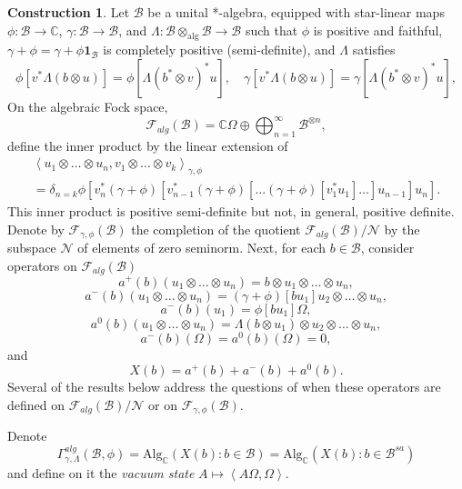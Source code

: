 \documentclass[12pt]{amsart}
\theoremstyle{definition}
\newtheorem{Construction}[Thm]{Construction}
\newcommand{\mf}[1]{\mathbb{#1}}
\newcommand{\mc}[1]{\mathcal{#1}}
\newcommand{\mb}[1]{\mathbf{#1}}
\newcommand{\ip}[2]{\left \langle{#1},{#2} \right \rangle}
\begin{document}
\begin{Construction}
\label{Construction:gamma}
Let $\mc{B}$ be a unital *-algebra, equipped with star-linear maps $\phi : \mc{B} \rightarrow \mf{C}$, $\gamma : \mc{B} \rightarrow \mc{B}$, and $\Lambda: \mc{B} \otimes_{\text{alg}} \mc{B} \rightarrow \mc{B}$ such that $\phi$ is positive and faithful, $\gamma + \phi = \gamma + \phi \mb{1}_{\mc{B}}$ is completely positive (semi-definite), and $\Lambda$ satisfies
\begin{equation}
\label{Eq:a0-symmetric}
\phi[v^\ast \Lambda(b \otimes u)] = \phi[\Lambda(b^\ast \otimes v)^\ast u], \quad \gamma[v^\ast \Lambda(b \otimes u)] = \gamma[\Lambda(b^\ast \otimes v)^\ast u],
\end{equation}
On the algebraic Fock space,
\[
\mc{F}_{alg}(\mc{B}) = \mf{C} \Omega \oplus \bigoplus_{n=1}^\infty \mc{B}^{\otimes n},
\]
define the inner product by the linear extension of
\begin{multline}
\label{Eq:Inner-product}
\ip{u_1 \otimes \ldots \otimes u_n}{v_1 \otimes \ldots \otimes v_k}_{\gamma,\phi} \\
= \delta_{n=k} \phi \left[ v_n^\ast (\gamma + \phi)[v_{n-1}^\ast (\gamma + \phi)[ \ldots (\gamma + \phi)[ v_1^\ast u_1] \ldots ] u_{n-1}] u_n \right].
\end{multline}
This inner product is positive semi-definite but not, in general, positive definite. Denote by $\mc{F}_{\gamma, \phi}(\mc{B})$ the completion of the quotient  $\mc{F}_{alg}(\mc{B}) / \mc{N}$ by the subspace $\mc{N}$ of elements of zero seminorm. Next, for each $b \in \mc{B}$, consider operators on $\mc{F}_{alg}(\mc{B})$
\[
a^+(b) (u_1 \otimes \ldots \otimes u_n) = b \otimes u_1 \otimes \ldots \otimes u_n,
\]
\[
a^-(b) (u_1 \otimes \ldots \otimes u_n) = (\gamma + \phi)[b u_1] u_2 \otimes \ldots \otimes u_n,
\]
\[
a^-(b) (u_1) = \phi[b u_1] \Omega,
\]
\[
a^0(b) (u_1 \otimes \ldots \otimes u_n) = \Lambda(b \otimes u_1) \otimes  u_2 \otimes \ldots \otimes u_n,
\]
\[
a^-(b) (\Omega) = a^0(b)(\Omega) = 0,
\]
and
\[
X(b) = a^+(b) + a^-(b) + a^0(b).
\]
Several of the results below address the questions of when these operators are defined on $\mc{F}_{alg}(\mc{B}) / \mc{N}$ or on $\mc{F}_{\gamma, \phi}(\mc{B})$.

Denote
\[
\Gamma^{alg}_{\gamma, \Lambda}(\mc{B}, \phi) = \mathrm{Alg}_{\mf{C}}(X(b) : b \in \mc{B}) = \mathrm{Alg}_{\mf{C}}(X(b) : b \in \mc{B}^{sa})
\]
and define on it the \emph{vacuum state} $A \mapsto \ip{A \Omega}{\Omega}$.
\end{Construction}
\end{document}

